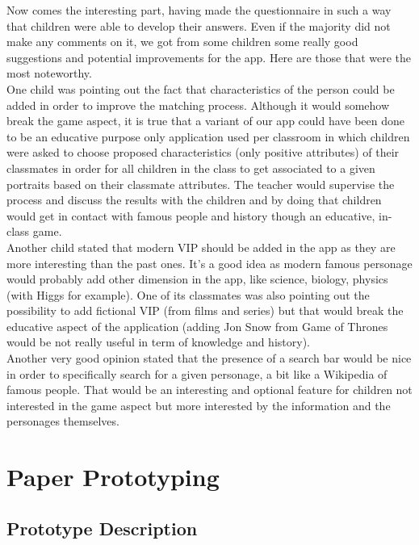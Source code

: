 \documentclass[12pt]{scrartcl}
\begin{document}

		Now comes the interesting part, having made the questionnaire in such a way that children were able to develop their answers. Even if the majority did not make any comments on it, we got from some children some really good suggestions and potential improvements for the app. Here are those that were the most noteworthy.\\

		One child was pointing out the fact that characteristics of the person could be added in order to improve the matching process. Although it would somehow break the game aspect, it is true that a variant of our app could have been done to be an educative purpose only application used per classroom in which children were asked to choose proposed characteristics (only positive attributes) of their classmates in order for all children in the class to get associated to a given portraits based on their classmate attributes. The teacher would supervise the process and discuss the results with the children and by doing that children would get in contact with famous people and history though an educative, in-class game.\\
		
		Another child stated that modern VIP should be added in the app as they are more interesting than the past ones. It’s a good idea as modern famous personage would probably add other dimension in the app, like science, biology, physics (with Higgs for example). One of its classmates was also pointing out the possibility to add fictional VIP (from films and series) but that would break the educative aspect of the application (adding Jon Snow from Game of Thrones would be not really useful in term of knowledge and history).\\
		
		Another very good opinion stated that the presence of a search bar would be nice in order to specifically search for a given personage, a bit like a Wikipedia of famous people. That would be an interesting and optional feature for children not interested in the game aspect but more interested by the information and the personages themselves.

	
\section{Paper Prototyping}

	\subsection{Prototype Description}
\end{document}
